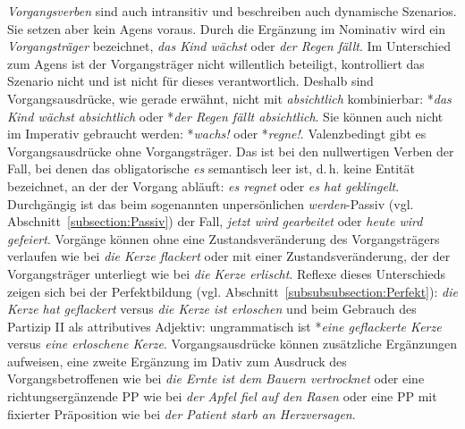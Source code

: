 \textit{Vorgangsverben} sind auch intransitiv und beschreiben auch dynamische Szenarios. Sie setzen aber kein Agens voraus. Durch die Ergänzung im Nominativ wird ein \textit{Vorgangsträger} bezeichnet, \zB \textit{das Kind wächst} oder \textit{der Regen fällt}. Im Unterschied zum Agens ist der Vorgangsträger nicht willentlich beteiligt, kontrolliert das Szenario nicht und ist nicht für dieses verantwortlich. Deshalb sind Vorgangsausdrücke, wie gerade erwähnt, nicht mit \textit{absichtlich} kombinierbar: *\textit{das Kind wächst absichtlich} oder *\textit{der Regen fällt absichtlich}. Sie können auch nicht im Imperativ gebraucht werden: *\textit{wachs!} oder *\textit{regne!}. Valenzbedingt gibt es Vorgangsausdrücke ohne Vorgangsträger. Das ist bei den nullwertigen Verben der Fall, bei denen das obligatorische \textit{es} semantisch leer ist, d.\,h. keine Entität bezeichnet, an der der Vorgang abläuft: \textit{es regnet} oder \textit{es hat geklingelt}. Durchgängig ist das beim sogenannten unpersönlichen \textit{werden}-Passiv (vgl. Abschnitt~\ref{subsection:Passiv}) der Fall, \zB \textit{jetzt wird gearbeitet} oder \textit{heute wird gefeiert}.
Vorgänge können ohne eine Zustandsveränderung des Vorgangsträgers verlaufen wie bei \textit{die Kerze flackert} oder mit einer Zustandsveränderung, der der Vorgangsträger unterliegt wie bei \textit{die Kerze erlischt}. Reflexe dieses Unterschieds zeigen sich bei der Perfektbildung (vgl. Abschnitt~\ref{subsubsubsection:Perfekt}): \textit{die Kerze hat geflackert} versus \textit{die Kerze ist erloschen} und beim Gebrauch des Partizip II als attributives Adjektiv: ungrammatisch ist *\textit{eine geflackerte Kerze} versus \textit{eine erloschene Kerze}. 
Vorgangsausdrücke können zusätzliche Ergänzungen aufweisen, \zB eine zweite Ergänzung im Dativ zum Ausdruck des Vorgangsbetroffenen wie bei \textit{die Ernte ist dem Bauern vertrocknet} oder eine richtungsergänzende PP wie bei \textit{der Apfel fiel auf den Rasen} oder eine PP mit fixierter Präposition wie bei \textit{der Patient starb an Herzversagen}.    

